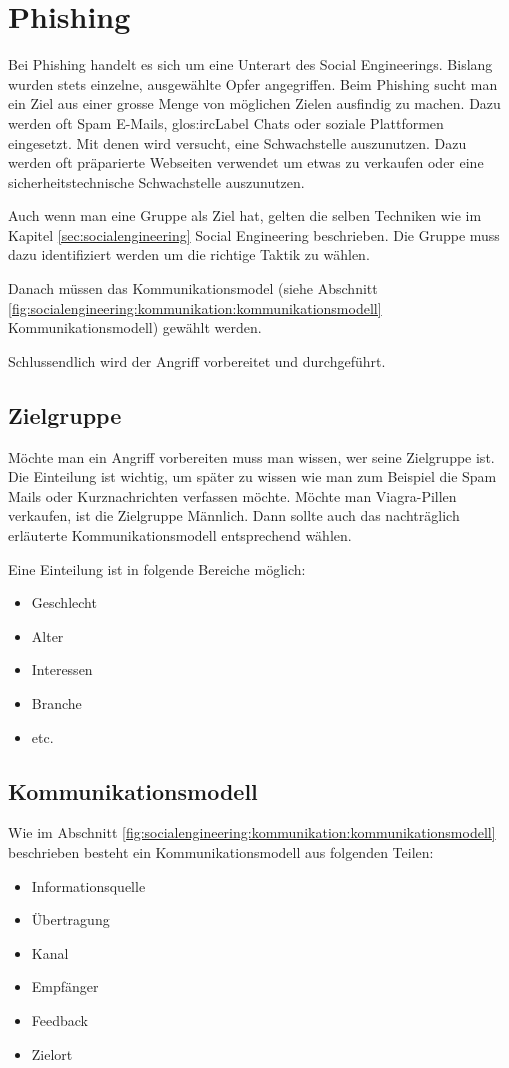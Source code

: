 \setcounter{secnumdepth}{3}
\chapter{Phishing}
Bei Phishing handelt es sich um eine Unterart des Social Engineerings. Bislang wurden stets einzelne, ausgewählte Opfer angegriffen.
Beim Phishing sucht man ein Ziel aus einer grosse Menge von möglichen Zielen ausfindig zu machen. Dazu werden oft Spam E-Mails, \Gls{glos:ircLabel} Chats oder soziale Plattformen eingesetzt. Mit denen wird versucht, eine Schwachstelle auszunutzen. Dazu werden oft präparierte Webseiten verwendet um etwas zu verkaufen oder eine sicherheitstechnische Schwachstelle auszunutzen.

Auch wenn man eine Gruppe als Ziel hat, gelten die selben Techniken wie im Kapitel \ref{sec:socialengineering} Social Engineering beschrieben.
Die Gruppe muss dazu identifiziert werden um die richtige Taktik zu wählen.

Danach müssen das Kommunikationsmodel (siehe Abschnitt \ref{fig:socialengineering:kommunikation:kommunikationsmodell} Kommunikationsmodell) gewählt werden.

Schlussendlich wird der Angriff vorbereitet und durchgeführt.

\section{Zielgruppe}
Möchte man ein Angriff vorbereiten muss man wissen, wer seine Zielgruppe ist. Die Einteilung ist wichtig, um später zu wissen wie man zum Beispiel die Spam Mails oder Kurznachrichten verfassen möchte. Möchte man Viagra-Pillen verkaufen, ist die Zielgruppe Männlich. Dann sollte auch das nachträglich erläuterte Kommunikationsmodell entsprechend wählen.

Eine Einteilung ist in folgende Bereiche möglich:
\begin{itemize}
\item Geschlecht
\item Alter
\item Interessen
\item Branche
\item etc.
\end{itemize}

\section{Kommunikationsmodell}
Wie im Abschnitt \ref{fig:socialengineering:kommunikation:kommunikationsmodell} beschrieben besteht ein Kommunikationsmodell aus folgenden Teilen:
\begin{itemize}
\item Informationsquelle
\item Übertragung
\item Kanal
\item Empfänger
\item Feedback
\item Zielort
\end{itemize}

